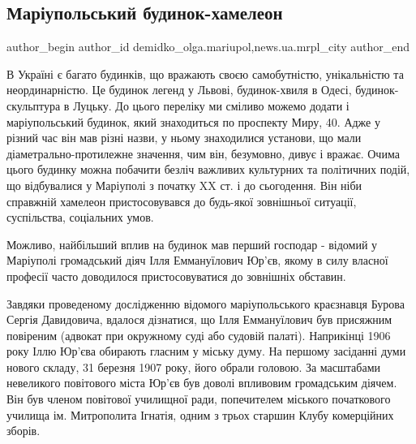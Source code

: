  
 
 
 
 
 
\subsection{Маріупольський будинок-хамелеон}
\label{sec:03_10_2017.stz.news.ua.mrpl_city.1.budynok_hameleon}
 
\ifcmt
 author_begin
   author_id demidko_olga.mariupol,news.ua.mrpl_city
 author_end
\fi

В Україні є багато будинків, що вражають своєю самобутністю, унікальністю та
неординарністю. Це  будинок легенд у Львові, будинок-хвиля в Одесі,
будинок-скульптура в Луцьку. До цього переліку ми сміливо можемо додати і
маріупольський будинок, який знаходиться по проспекту Миру, 40. Адже у різний
час він мав різні назви, у ньому знаходилися установи, що мали
діаметрально-протилежне значення, чим він, безумовно, дивує і вражає. Очима
цього будинку можна побачити безліч важливих культурних та політичних подій, що
відбувалися у Маріуполі з початку XX ст. і до сьогодення. Він ніби справжній
хамелеон пристосовувався до будь-якої зовнішньої ситуації, суспільства,
соціальних умов.


Можливо, найбільший вплив на будинок мав перший господар - відомий у Маріуполі
громадський діяч Ілля Еммануїлович Юр'єв, якому в силу власної професії часто
доводилося пристосовуватися до зовнішніх обставин.

Завдяки проведеному дослідженню відомого маріупольського краєзнавця Бурова
Сергія Давидовича, вдалося дізнатися, що Ілля Еммануїлович був присяжним
повіреним (адвокат при окружному суді або судовій палаті). Наприкінці 1906 року
Іллю Юр'єва обирають гласним у міську думу. На першому засіданні думи нового
складу, 31 березня 1907 року, його обрали головою. За масштабами невеликого
повітового міста Юр'єв був доволі впливовим громадським діячем. Він був членом
повітової училищної ради, попечителем міського початкового училища ім.
Митрополита Ігнатія, одним з трьох старшин Клубу комерційних зборів.

